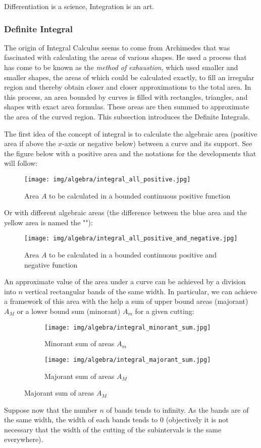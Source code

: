 		 \begin{fquote}Differentiation is a science, Integration is an art.
 		\end{fquote}
		 
		 \subsubsection{Definite Integral}\label{definite integral}
		 The origin of Integral Calculus seems to come from Archimedes that was fascinated with calculating the areas of various shapes. He used a process that has come to be known as the \textit{method of exhaustion}, which used smaller and smaller shapes, the areas of which could be calculated exactly, to fill an irregular region and thereby obtain closer and closer approximations to the total area. In this process, an area bounded by curves is filled with rectangles, triangles, and shapes with exact area formulas. These areas are then summed to approximate the area of the curved region. This subsection introduces the Definite Integrals.
		 		 
		 The first idea of the concept of integral is to calculate the algebraic area (positive area if above the $x$-axis or negative below) between a curve and its support. See the figure below with a positive area and the notations for the developments that will follow:
		 \begin{figure}[H]
			\centering
			\texttt{[image: img/algebra/integral\_all\_positive.jpg]}
			\caption[]{Area $A$ to be calculated in a bounded continuous positive function}
		\end{figure}
		Or with different algebraic areas (the difference between the blue area and the yellow area is named the ""):
		 \begin{figure}[H]
			\centering
			\texttt{[image: img/algebra/integral\_all\_positive\_and\_negative.jpg]}
			\caption[]{Area $A$ to be calculated in a bounded continuous positive and negative function}
		\end{figure}
		An approximate value of the area under a curve can be achieved by a division into $n$ vertical rectangular bands of the same width. In particular, we can achieve a framework of this area with the help a sum of upper bound areas (majorant) $A_M$ or a lower bound sum (minorant) $A_m$ for a given cutting:
		\begin{figure}[H]
			\centering
			\begin{subfigure}{0.4\textwidth}
				\texttt{[image: img/algebra/integral\_minorant\_sum.jpg]}
				\caption{Minorant sum of areas $A_m$}
			\end{subfigure}
			\begin{subfigure}{0.4\textwidth}
				\texttt{[image: img/algebra/integral\_majorant\_sum.jpg]}
				\caption{Majorant sum of areas $A_M$}
			\end{subfigure}				
		\end{figure}
		Suppose now that the number $n$ of bands tends to infinity. As the bands are of the same width, the width of each bands tends to $0$ (objectively it is not necessary that the width of the cutting of the subintervals is the same everywhere).
		
